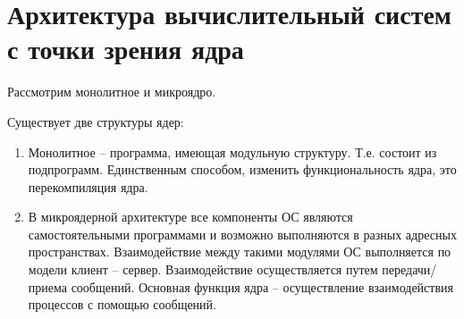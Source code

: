 \chapter{Архитектура вычислительный систем с точки зрения ядра}
Рассмотрим монолитное и микроядро. 

Существует две структуры ядер:
\begin{enumerate}
    \item Монолитное – программа, имеющая модульную структуру. Т.е. состоит из подпрограмм. Единственным способом, изменить функциональность ядра, это перекомпиляция ядра.
   \item В микроядерной архитектуре все компоненты ОС являются самостоятельными программами и возможно выполняются в разных адресных пространствах. Взаимодействие между такими модулями ОС выполняется по модели клиент – сервер. Взаимодействие осуществляется путем передачи/приема сообщений. Основная функция ядра – осуществление взаимодействия процессов с помощью сообщений.
\end{enumerate} 
